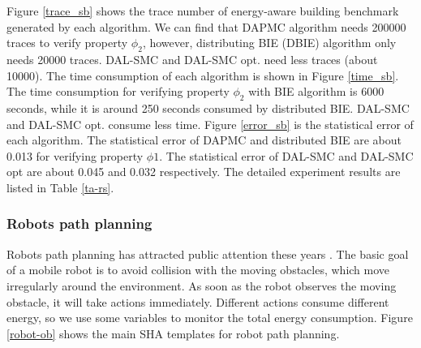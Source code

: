 Figure \ref{trace_sb} shows the trace number of energy-aware building benchmark generated by each algorithm. We can find that DAPMC algorithm needs 200000 traces to verify property $\phi_2$, however, distributing BIE (DBIE) algorithm only needs 20000 traces. DAL-SMC and DAL-SMC opt. need less traces (about 10000). The time consumption of each algorithm is shown in Figure \ref{time_sb}. The time consumption for verifying property $\phi_2$ with BIE algorithm is 6000 seconds, while it is around 250 seconds consumed by distributed BIE. DAL-SMC and DAL-SMC opt. consume less time. Figure \ref{error_sb} is the statistical error of each algorithm. The statistical error of DAPMC and distributed BIE are about 0.013 for verifying property $\phi1$. The statistical error of DAL-SMC and DAL-SMC opt are about 0.045 and 0.032 respectively. The detailed experiment results are listed in Table \ref{ta-rs}. 

\subsubsection{Robots path planning}

Robots path planning has attracted public attention these years \cite{LWAB10}. The basic goal of a mobile robot is to avoid collision with the moving obstacles, which move irregularly around the environment. As soon as the robot observes the moving obstacle, it will take actions immediately. Different actions consume different energy, so we use some variables to monitor the total energy consumption. Figure \ref{robot-ob} shows the main SHA templates for robot path planning.

\begin{figure}[htbp]
\end{figure}



